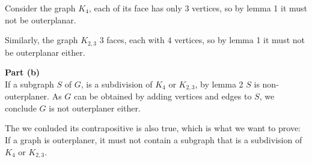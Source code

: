 \documentclass{article}
\begin{document}
Consider the graph $K_4$, each of its face has only $3$ vertices, so by lemma 1 it must not be outerplanar.

Similarly, the graph $K_{2,3}$ 3 faces, each with $4$ vertices, so by lemma 1 it must not be outerplanar either.

\textbf{Part (b)}\\
If a subgraph $S$ of $G$, is a subdivision of $K_4$ or $K_{2,3}$, by lemma 2 $S$ is non-outerplaner. As $G$ can be obtained by adding vertices and edges to $S$, we conclude $G$ is not outerplaner either.
	
The we conluded its contrapositive is also true, which is what we want to prove: If a graph is outerplaner, it must not contain a subgraph that is a subdivision of $K_4$ or $K_{2,3}$.
\end{document}
